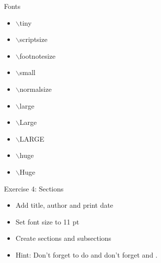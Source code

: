 \documentclass[10pt,times]{beamer}
\begin{document}
\begin{frame}{Fonts}
\begin{itemize}
\item \tiny $\backslash$tiny
\item \scriptsize $\backslash$scriptsize
\item \footnotesize $\backslash$footnotesize
\item \small $\backslash$small
\item \normalsize $\backslash$normalsize
\item \large $\backslash$large
\item \Large $\backslash$Large
\item \LARGE $\backslash$LARGE
\item \huge $\backslash$huge
\item \Huge $\backslash$Huge
\end{itemize}
\end{frame}

\begin{frame}{Exercise 4: Sections}
\begin{itemize}
\item Add title, author and print date
\item Set font size to 11 pt
\item Create sections and subsections
\end{itemize}
\begin{center}
\end{center}

\begin{itemize}
\item Hint: Don't forget to do  and don't forget 
 and 
.
\end{itemize}

\end{frame}
\end{document}
